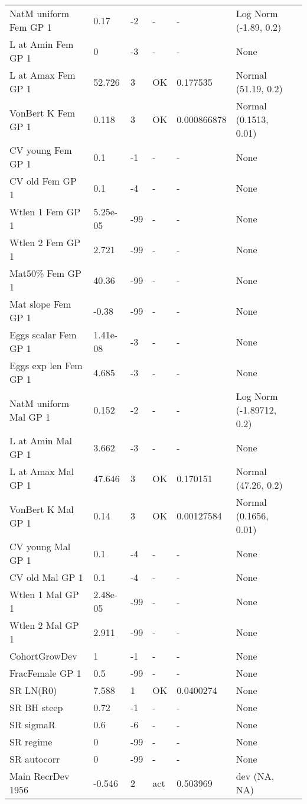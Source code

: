 \documentclass[11pt,
  english,
  letterpaper,
]{article}
\begin{document}
\begin{landscape}
\begin{longtable}[t]{>{\raggedright\arraybackslash}p{6cm}lllll>{\raggedright\arraybackslash}p{4cm}}
\endfoot
\bottomrule
\endlastfoot
NatM uniform Fem GP 1 & 0.17 & -2 & - & - & Log Norm (-1.89, 0.2)\\
L at Amin Fem GP 1 & 0 & -3 & - & - & None\\
L at Amax Fem GP 1 & 52.726 & 3 & OK & 0.177535 & Normal (51.19, 0.2)\\
VonBert K Fem GP 1 & 0.118 & 3 & OK & 0.000866878 & Normal (0.1513, 0.01)\\
CV young Fem GP 1 & 0.1 & -1 & - & - & None\\
CV old Fem GP 1 & 0.1 & -4 & - & - & None\\
Wtlen 1 Fem GP 1 & 5.25e-05 & -99 & - & - & None\\
Wtlen 2 Fem GP 1 & 2.721 & -99 & - & - & None\\
Mat50\% Fem GP 1 & 40.36 & -99 & - & - & None\\
Mat slope Fem GP 1 & -0.38 & -99 & - & - & None\\
Eggs scalar Fem GP 1 & 1.41e-08 & -3 & - & - & None\\
Eggs exp len Fem GP 1 & 4.685 & -3 & - & - & None\\
NatM uniform Mal GP 1 & 0.152 & -2 & - & - & Log Norm (-1.89712, 0.2)\\
L at Amin Mal GP 1 & 3.662 & -3 & - & - & None\\
L at Amax Mal GP 1 & 47.646 & 3 & OK & 0.170151 & Normal (47.26, 0.2)\\
VonBert K Mal GP 1 & 0.14 & 3 & OK & 0.00127584 & Normal (0.1656, 0.01)\\
CV young Mal GP 1 & 0.1 & -4 & - & - & None\\
CV old Mal GP 1 & 0.1 & -4 & - & - & None\\
Wtlen 1 Mal GP 1 & 2.48e-05 & -99 & - & - & None\\
Wtlen 2 Mal GP 1 & 2.911 & -99 & - & - & None\\
CohortGrowDev & 1 & -1 & - & - & None\\
FracFemale GP 1 & 0.5 & -99 & - & - & None\\
SR LN(R0) & 7.588 & 1 & OK & 0.0400274 & None\\
SR BH steep & 0.72 & -1 & - & - & None\\
SR sigmaR & 0.6 & -6 & - & - & None\\
SR regime & 0 & -99 & - & - & None\\
SR autocorr & 0 & -99 & - & - & None\\
Main RecrDev 1956 & -0.546 & 2 & act & 0.503969 & dev (NA, NA)\\

\end{longtable}
\end{landscape}
\end{document}
